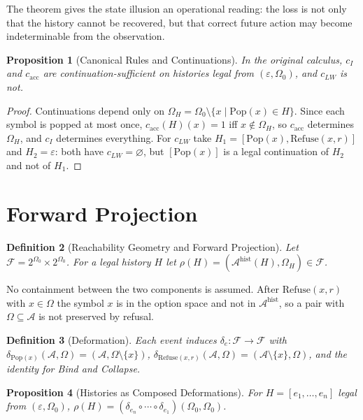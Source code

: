 \documentclass[12pt,oneside,openany]{book}
\theoremstyle{spherepop}
\newtheorem{definition}{Definition}[chapter]
\newtheorem{proposition}[definition]{Proposition}
\theoremstyle{remarkstyle}
\newcommand{\Pop}{\mathrm{Pop}}
\newcommand{\Rfuse}{\mathrm{Refuse}}
\newcommand{\calA}{\mathcal{A}}
\begin{document}
The theorem gives the state illusion an operational reading: the loss is not only that the history cannot be recovered, but that correct future action may become indeterminable from the observation.

\begin{proposition}[Canonical Rules and Continuations]
\label{prop:cont-rules}
In the original calculus, $c_I$ and $c_{\mathrm{acc}}$ are continuation-sufficient on histories legal from $(\varepsilon,\Omega_0)$, and $c_{LW}$ is not.
\end{proposition}

\begin{proof}
Continuations depend only on $\Omega_H=\Omega_0\setminus\{x\mid\Pop(x)\in H\}$. Since each symbol is popped at most once, $c_{\mathrm{acc}}(H)(x)=1$ iff $x\notin\Omega_H$, so $c_{\mathrm{acc}}$ determines $\Omega_H$, and $c_I$ determines everything. For $c_{LW}$ take $H_1=[\Pop(x),\Rfuse(x,r)]$ and $H_2=\varepsilon$: both have $c_{LW}=\varnothing$, but $[\Pop(x)]$ is a legal continuation of $H_2$ and not of $H_1$.
\end{proof}

\section{Forward Projection}

\begin{definition}[Reachability Geometry and Forward Projection]
Let $\mathcal F=2^{\Omega_0}\times2^{\Omega_0}$. For a legal history $H$ let $\rho(H)=(\calA^{\mathrm{hist}}(H),\Omega_H)\in\mathcal F$.
\end{definition}

No containment between the two components is assumed. After $\Rfuse(x,r)$ with $x\in\Omega$ the symbol $x$ is in the option space and not in $\calA^{\mathrm{hist}}$, so a pair with $\Omega\subseteq\calA$ is not preserved by refusal.

\begin{definition}[Deformation]
Each event induces $\delta_e:\mathcal F\to\mathcal F$ with $\delta_{\Pop(x)}(\calA,\Omega)=(\calA,\Omega\setminus\{x\})$, $\delta_{\Rfuse(x,r)}(\calA,\Omega)=(\calA\setminus\{x\},\Omega)$, and the identity for Bind and Collapse.
\end{definition}

\begin{proposition}[Histories as Composed Deformations]
\label{prop:deformation}
For $H=[e_1,\dots,e_n]$ legal from $(\varepsilon,\Omega_0)$, $\rho(H)=(\delta_{e_n}\circ\cdots\circ\delta_{e_1})(\Omega_0,\Omega_0)$.
\end{proposition}
\end{document}
